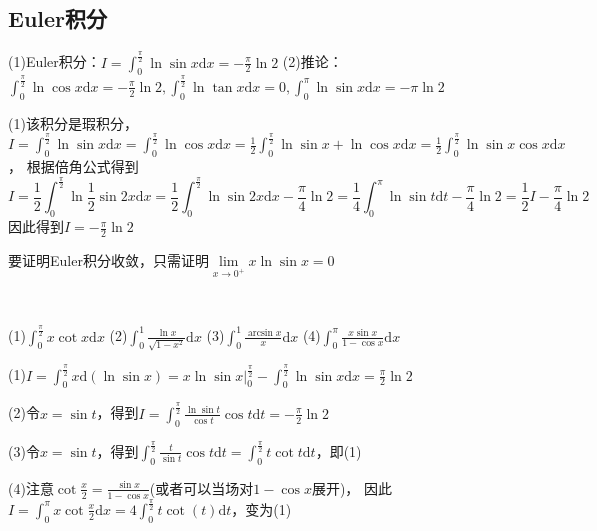 \subsection{Euler积分}

\begin{exercise}[Euler积分]
  (1)Euler积分：$I = \int_0^{\frac{\pi}{2}} \ln \sin x \mathrm{d}x = - \frac{\pi}{2} \ln 2$
  (2)推论：$\int_0^{\frac{\pi}{2}} \ln \cos x \mathrm{d}x = - \frac{\pi}{2} \ln 2, \int_0^{\frac{\pi}{2}} \ln \tan x \mathrm{d}x = 0, \int_0^{\pi} \ln \sin x \mathrm{d}x = -\pi \ln 2$
\end{exercise}

\begin{solution}
  (1)该积分是瑕积分，$I = \int_0^{\frac{\pi}{2}} \ln \sin x \mathrm{d}x = \int_0^{\frac{\pi}{2}} \ln \cos x \mathrm{d}x = \frac{1}{2} \int_0^{\frac{\pi}{2}} \ln \sin x + \ln \cos x \mathrm{d}x = \frac{1}{2} \int_0^{\frac{\pi}{2}} \ln \sin x \cos x \mathrm{d}x$，
  根据倍角公式得到
  \begin{equation*}
    I = \frac{1}{2} \int_0^{\frac{\pi}{2}} \ln \frac{1}{2} \sin 2x \mathrm{d}x = \frac{1}{2} \int_0^{\frac{\pi}{2}} \ln \sin 2x \mathrm{d}x - \frac{\pi}{4} \ln 2= \frac{1}{4} \int_0^{\pi} \ln \sin t\mathrm{d}t - \frac{\pi}{4} \ln 2 = \frac{1}{2}I - \frac{\pi}{4} \ln 2
  \end{equation*}
  因此得到$I = - \frac{\pi}{2} \ln 2$
\end{solution}

\begin{note}
  要证明Euler积分收敛，只需证明$\lim \limits _{x \rightarrow 0^+} x \ln \sin x = 0$
\end{note}

~

\begin{exercise}[Euler积分的应用]
  (1)$\int_0^{\frac{\pi}{2}} x \cot x \mathrm{d}x$
  (2)$\int_0^1 \frac{\ln x}{\sqrt{1 - x^2}}\mathrm{d}x$
  (3)$\int_0^1 \frac{\arcsin x }{x}\mathrm{d}x$
  (4)$\int_0^{\pi} \frac{x \sin x}{1 - \cos x}\mathrm{d}x$
\end{exercise}

\begin{solution}
  (1)$I = \int_0^{\frac{\pi}{2}} x \mathrm{d}(\ln \sin x) = x \ln \sin x |_0^{\frac{\pi}{2}} - \int _0^{\frac{\pi}{2}} \ln \sin x \mathrm{d}x = \frac{\pi}{2} \ln 2$

  (2)令$x = \sin t$，得到$I = \int_0^{\frac{\pi}{2}} \frac{\ln \sin t}{\cos t} \cos t \mathrm{d}t = - \frac{\pi}{2} \ln 2$

  (3)令$x = \sin t$，得到$\int_0^{\frac{\pi}{2}} \frac{t}{\sin t}\cos t \mathrm{d}t = \int_0^{\frac{\pi}{2}} t \cot t \mathrm{d}t$，即(1)

  (4)注意$\cot \frac{x}{2} = \frac{\sin x }{ 1 - \cos x}$(或者可以当场对$1 - \cos x$展开)，
  因此$I = \int_0^{\pi}x \cot \frac{x}{2}\mathrm{d}x = 4 \int_0^{\frac{\pi}{2}} t \cot(t)\mathrm{d}t$，变为(1)
\end{solution}

